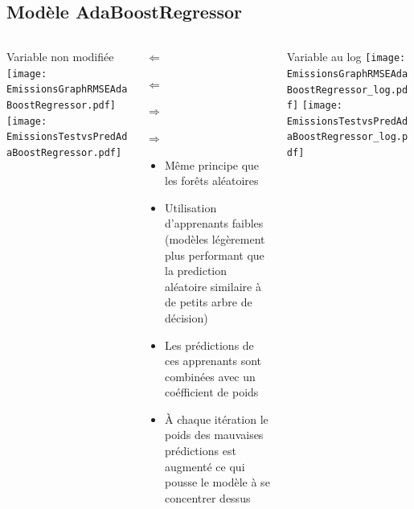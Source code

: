 \documentclass[8pt,aspectratio=169,hyperref={unicode=true}]{beamer}
\begin{document}
\subsection{Modèle AdaBoostRegressor}
\begin{frame}{\insertsubsection}
  \begin{columns}[t]
    \begin{column}{.33\textwidth}
      \centering Variable non modifiée
      \texttt{[image: EmissionsGraphRMSEAdaBoostRegressor.pdf]}
      \texttt{[image: EmissionsTestvsPredAdaBoostRegressor.pdf]}
    \end{column}
    \begin{column}{.33\textwidth}
      $\Longleftarrow$
      \scriptsize
      {\centering
        }
      

      \normalsize
      $\Longleftarrow$

      \raggedleft $\Longrightarrow$
      \scriptsize
      {\centering
        }
      

      \normalsize
      $\Longrightarrow$

      \footnotesize
      \begin{itemize}
        \item Même principe que les forêts aléatoires
        \item Utilisation d'apprenants faibles (modèles légèrement plus performant que la prediction aléatoire
              similaire à de petits arbre de décision)
        \item Les prédictions de ces apprenants sont combinées avec un coéfficient de poids
        \item À chaque itération le poids des mauvaises prédictions est augmenté ce qui pousse le modèle
              à se concentrer dessus
      \end{itemize}
    \end{column}
    \begin{column}{.33\textwidth}
      \centering Variable au log
      \texttt{[image: EmissionsGraphRMSEAdaBoostRegressor\_log.pdf]}
      \texttt{[image: EmissionsTestvsPredAdaBoostRegressor\_log.pdf]}
    \end{column}
  \end{columns}
\end{frame}
\end{document}
